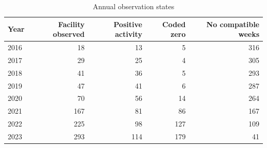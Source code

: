 \begin{table}[htbp]\centering\small
\caption{Annual observation states}\label{tab:si_coverage}
\begin{tabular}{@{}lrrrr@{}}
\toprule
Year & Facility observed & Positive activity & Coded zero & No compatible weeks \\\midrule
2016 & 18 & 13 & 5 & 316 \\
2017 & 29 & 25 & 4 & 305 \\
2018 & 41 & 36 & 5 & 293 \\
2019 & 47 & 41 & 6 & 287 \\
2020 & 70 & 56 & 14 & 264 \\
2021 & 167 & 81 & 86 & 167 \\
2022 & 225 & 98 & 127 & 109 \\
2023 & 293 & 114 & 179 & 41 \\
\bottomrule\end{tabular}
\end{table}
